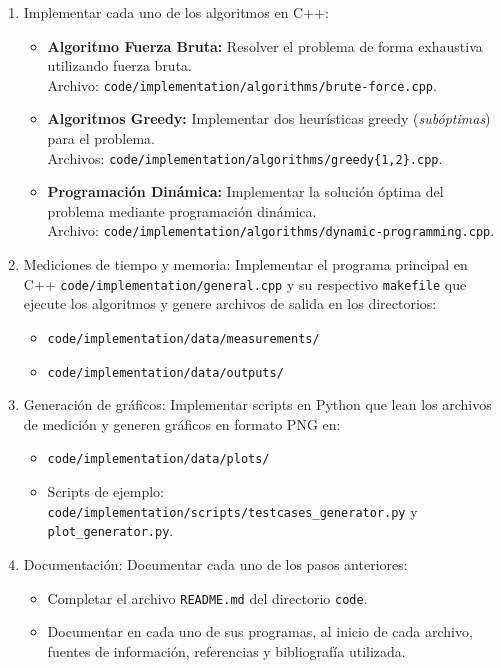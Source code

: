 \begin{enumerate}[(1)]
    \item Implementar cada uno de los algoritmos en C++:
    \begin{itemize}
        \item \textbf{Algoritmo Fuerza Bruta:} Resolver el problema de forma exhaustiva utilizando fuerza bruta. \\
        Archivo: \texttt{code/implementation/algorithms/brute-force.cpp}.
        
        \item \textbf{Algoritmos Greedy:} Implementar dos heurísticas greedy (\textit{subóptimas}) para el problema. \\
        Archivos: \texttt{code/implementation/algorithms/greedy\{1,2\}.cpp}.
        
        \item \textbf{Programación Dinámica:} Implementar la solución óptima del problema mediante programación dinámica. \\
        Archivo: \texttt{code/implementation/algorithms/dynamic-programming.cpp}.
    \end{itemize}


    \item Mediciones de tiempo y memoria: Implementar el programa principal en C++ \texttt{code/implementation/general.cpp} y su respectivo \texttt{makefile} que ejecute los algoritmos y genere archivos de salida en los directorios:
    \begin{itemize}
        \item \texttt{code/implementation/data/measurements/}
        \item \texttt{code/implementation/data/outputs/}
    \end{itemize}

    \item Generación de gráficos: Implementar scripts en Python que lean los archivos de medición y generen gráficos en formato PNG en:
    \begin{itemize}
        \item \texttt{code/implementation/data/plots/}
        \item Scripts de ejemplo: \texttt{code/implementation/scripts/testcases\_generator.py} y \texttt{plot\_generator.py}.
    \end{itemize}

    \item Documentación: Documentar cada uno de los pasos anteriores:
    \begin{itemize}
        \item Completar el archivo \texttt{README.md} del directorio \texttt{code}.
        \item Documentar en cada uno de sus programas, al inicio de cada archivo, fuentes de información, referencias y bibliografía utilizada.
    \end{itemize}
\end{enumerate}

